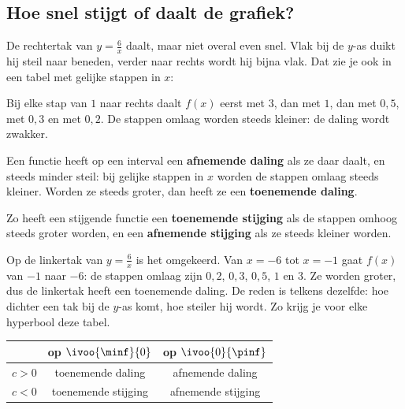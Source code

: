 \begin{oefeningen}
\end{oefeningen}

\subsection{Hoe snel stijgt of daalt de grafiek?}

De rechtertak van $y = \tfrac6x$ daalt, maar niet overal even snel. Vlak bij de $y$-as duikt hij steil naar beneden, verder naar rechts wordt hij bijna vlak. Dat zie je ook in een tabel met gelijke stappen in $x$:


Bij elke stap van $1$ naar rechts daalt $f(x)$ eerst met $3$, dan met $1$, dan met $0,5$, met $0,3$ en met $0,2$. De stappen omlaag worden steeds kleiner: de daling wordt zwakker.

\begin{theorie}
Een functie heeft op een interval een \textbf{\textcolor{accent}{afnemende daling}} als ze daar daalt, en steeds minder steil: bij gelijke stappen in $x$ worden de stappen omlaag steeds kleiner. Worden ze steeds groter, dan heeft ze een \textbf{\textcolor{accent}{toenemende daling}}.

\vspace{1mm}
Zo heeft een stijgende functie een \textbf{\textcolor{accent}{toenemende stijging}} als de stappen omhoog steeds groter worden, en een \textbf{\textcolor{accent}{afnemende stijging}} als ze steeds kleiner worden.
\end{theorie}

Op de linkertak van $y = \tfrac6x$ is het omgekeerd. Van $x = -6$ tot $x = -1$ gaat $f(x)$ van $-1$ naar $-6$: de stappen omlaag zijn $0,2$, $0,3$, $0,5$, $1$ en $3$. Ze worden groter, dus de linkertak heeft een toenemende daling. De reden is telkens dezelfde: hoe dichter een tak bij de $y$-as komt, hoe steiler hij wordt. Zo krijg je voor elke hyperbool deze tabel.

{\centering\renewcommand{\arraystretch}{1.45}\begin{tabular}{|c|c|c|}
\hline
 & \textbf{op $\ivoo{\minf}{0}$} & \textbf{op $\ivoo{0}{\pinf}$} \\ \hline
$c > 0$ & toenemende daling & afnemende daling \\ \hline
$c < 0$ & toenemende stijging & afnemende stijging \\ \hline
\end{tabular}\par}


